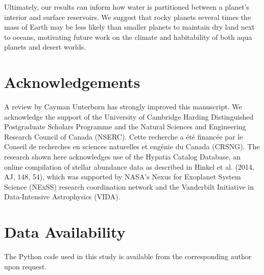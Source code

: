 \documentclass[fleqn,usenatbib]{mnras}
\newcommand{\todo}[1]{\textit{\textcolor{violet}{{#1}}}}
\begin{document}


Ultimately, our results can inform how water is partitioned between a planet's interior and surface reservoirs. We suggest that rocky planets several times the mass of Earth may be less likely than smaller planets to maintain dry land next to oceans, motivating future work on the climate and habitability of both aqua planets and desert worlds.



\section*{Acknowledgements}

A review by Cayman Unterborn has strongly improved this manuscript. We acknowledge the support of the University of Cambridge Harding Distinguished Postgraduate Scholars Programme and the Natural Sciences and Engineering Research Council of Canada (NSERC). Cette recherche a \'et\'e financ\'ee par le Conseil de recherches en sciences naturelles et eng\'enie du Canada (CRSNG). The research shown here acknowledges use of the Hypatia Catalog Database, an online compilation of stellar abundance data as described in Hinkel et al. (2014, AJ, 148, 54), which was supported by NASA's Nexus for Exoplanet System Science (NExSS) research coordination network and the Vanderbilt Initiative in Data-Intensive Astrophysics (VIDA).


\section*{Data Availability}


The Python code used in this study is available from the corresponding author upon request.





\end{document}
